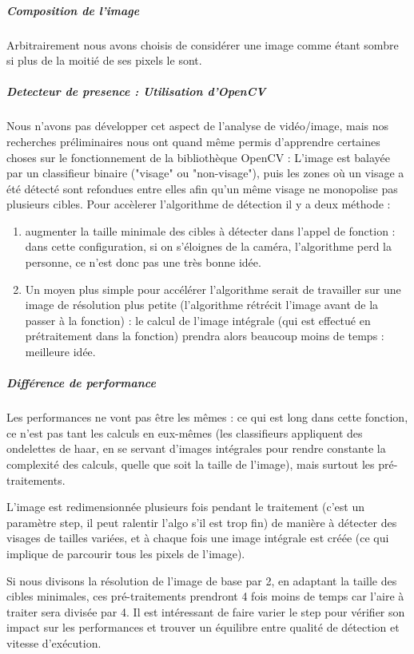 			\subparagraph{Composition de l'image}
					Arbitrairement nous avons choisis de considérer une image comme étant sombre si plus de la moitié de ses pixels le sont.
					
			\subparagraph{Detecteur de presence : Utilisation d'OpenCV}
				Nous n'avons pas développer cet aspect de l'analyse de vidéo/image, mais nos recherches préliminaires nous ont quand même permis d'apprendre certaines choses sur le fonctionnement de la bibliothèque OpenCV : L'image est balayée par un classifieur binaire ("visage" ou "non-visage"), puis les zones où un visage a été détecté sont refondues entre elles afin qu'un même visage ne monopolise pas plusieurs cibles. 
				Pour accèlerer l'algorithme de détection il y a deux méthode :
				\begin{enumerate}
					\item augmenter la taille minimale des cibles à détecter dans l'appel de fonction : dans cette configuration, si on s'éloignes de la caméra, l'algorithme perd la personne, ce n'est donc pas une très bonne idée.
					\item Un moyen plus simple pour accélérer l'algorithme serait de travailler sur une image de résolution plus petite (l'algorithme rétrécit l'image avant de la passer à la fonction) : le calcul de l'image intégrale (qui est effectué en prétraitement dans la fonction) prendra alors beaucoup moins de temps : meilleure idée.
				\end{enumerate}
		
			\subparagraph{Différence de performance}
				Les performances ne vont pas être les mêmes : ce qui est long dans cette fonction, ce n'est pas tant les calculs en eux-mêmes (les classifieurs appliquent des ondelettes de haar, en se servant d'images intégrales pour rendre constante la complexité des calculs, quelle que soit la taille de l'image), mais surtout les pré-traitements.
			
			L'image est redimensionnée plusieurs fois pendant le traitement (c'est un paramètre step, il peut ralentir l'algo s'il est trop fin) de manière à détecter des visages de tailles variées, et à chaque fois une image intégrale est créée (ce qui implique de parcourir tous les pixels de l'image).
			
			Si nous divisons la résolution de l'image de base par 2, en adaptant la taille des cibles minimales, ces pré-traitements prendront 4 fois moins de temps car l'aire à traiter sera divisée par 4. Il est intéressant de faire varier le step pour vérifier son impact sur les performances et trouver un équilibre entre qualité de détection et vitesse d'exécution.
			
